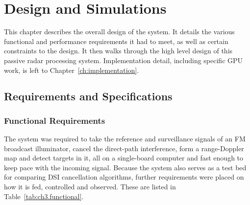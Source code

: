 \chapter{Design and Simulations}
\label{ch:design}

This chapter describes the overall design of the system. It details the various functional and performance requirements it had to meet, as well as certain constraints to the design. It then walks through the high level design of this passive radar processing system.
Implementation detail, including specific GPU work, is left to Chapter~\ref{ch:implementation}.

\section{Requirements and Specifications}
\label{sec:ch3.requirements}

\subsection{Functional Requirements}
\label{subsec:ch3.requirements.functional}

The system was required to take the reference and surveillance signals of an FM broadcast illuminator, cancel the direct-path interference, form a range-Doppler map and detect targets in it, all on a single-board computer and fast enough to keep pace with the incoming signal. Because the system also serves as a test bed for comparing DSI cancellation algorithms, further requirements were placed on how it is fed, controlled and observed. These are listed in Table~\ref{tab:ch3.functional}.

